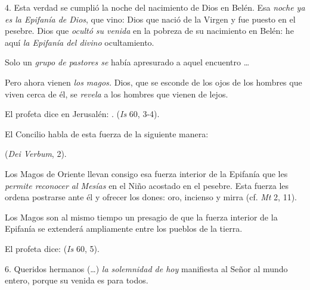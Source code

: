 \begin{body}
					4. Esta verdad se cumplió la noche del nacimiento de Dios en Belén. Esa \emph{noche ya es la Epifanía de Dios}, que vino: Dios que nació de la Virgen y fue puesto en el pesebre. Dios que \emph{ocultó su venida} en la pobreza de su nacimiento en Belén: he aquí \emph{la Epifanía del divino} ocultamiento.
					
					Solo un \emph{grupo de pastores se} había apresurado a aquel encuentro \ldots{}
					
					Pero ahora vienen \emph{los magos.} Dios, que se esconde de los ojos de los hombres que viven cerca de él, se \emph{revela} a los hombres que vienen de lejos.
					
					El profeta dice en Jerusalén: . (\emph{Is} 60, 3-4).
					
					El Concilio habla de esta fuerza de la siguiente manera:
					
					 (\emph{Dei Verbum}, 2).
					
					Los Magos de Oriente llevan consigo esa fuerza interior de la Epifanía que les \emph{permite reconocer al Mesías} en el Niño acostado en el pesebre. Esta fuerza les ordena postrarse ante él y ofrecer los dones: oro, incienso y mirra (cf. \emph{Mt} 2, 11).
					
					Los Magos son al mismo tiempo un presagio de que la fuerza interior de la Epifanía se extenderá ampliamente entre los pueblos de la tierra.
					
					El profeta dice:  (\emph{Is} 60, 5).
					
					6. Queridos hermanos (\ldots{}) \emph{la solemnidad de hoy} manifiesta al Señor al mundo entero, porque su venida es para todos.
					

\end{body}
